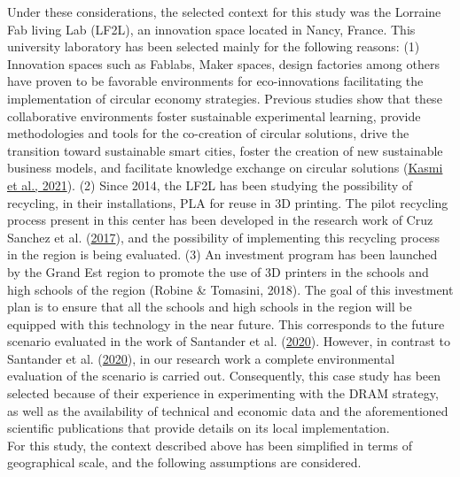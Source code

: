 \documentclass[]{elsarticle} %
\begin{document}
Under these considerations, the selected context for this study was the Lorraine Fab living Lab (LF2L), an innovation space located in Nancy, France. This university laboratory has been selected mainly for the following reasons:
(1) Innovation spaces such as Fablabs, Maker spaces, design factories among others have proven to be favorable environments for eco-innovations facilitating the implementation of circular economy strategies.
Previous studies show that these collaborative environments foster sustainable experimental learning, provide methodologies and tools for the co-creation of circular solutions, drive the transition toward sustainable smart cities, foster the creation of new sustainable business models, and facilitate knowledge exchange on circular solutions (\protect\hyperlink{ref-Kasmi2021}{Kasmi et al., 2021}).
(2) Since 2014, the LF2L has been studying the possibility of recycling, in their installations, PLA for reuse in 3D printing.
The pilot recycling process present in this center has been developed in the research work of Cruz Sanchez et al. (\protect\hyperlink{ref-CruzSanchez2017}{2017}), and the possibility of implementing this recycling process in the region is being evaluated.
(3) An investment program has been launched by the Grand Est region to promote the use of 3D printers in the schools and high schools of the region (Robine \& Tomasini, 2018).
The goal of this investment plan is to ensure that all the schools and high schools in the region will be equipped with this technology in the near future.
This corresponds to the future scenario evaluated in the work of Santander et al. (\protect\hyperlink{ref-Santander2020}{2020}).
However, in contrast to Santander et al. (\protect\hyperlink{ref-Santander2020}{2020}), in our research work a complete environmental evaluation of the scenario is carried out.
Consequently, this case study has been selected because of their experience in experimenting with the DRAM strategy, as well as the availability of technical and economic data and the aforementioned scientific publications that provide details on its local implementation.\\
For this study, the context described above has been simplified in terms of geographical scale, and the following assumptions are considered.
\end{document}
